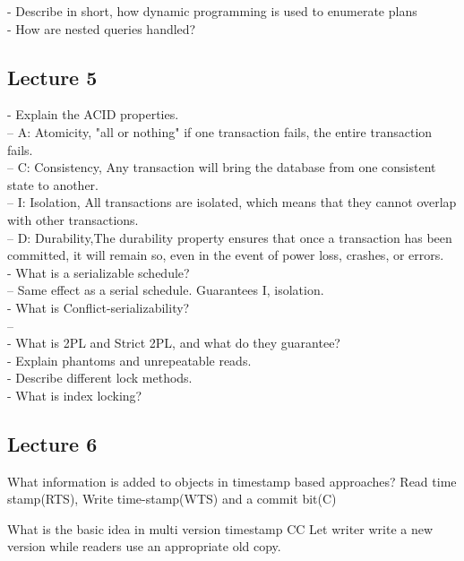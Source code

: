 \documentclass[a4paper,10pt,titlepage]{report}
\begin{document}
 - Describe in short, how dynamic programming is used to enumerate plans\\
 
 - How are nested queries handled?\\

\subsection{Lecture 5}

- Explain the ACID properties.\\
 -- A: Atomicity, "all or nothing" if one transaction fails, the entire transaction fails. \\
 -- C: Consistency, Any transaction will bring the database from one consistent state to another. \\
 -- I: Isolation, All transactions are isolated, which means that they cannot overlap with other transactions. \\
 -- D: Durability,The durability property ensures that once a transaction has been committed, it will remain so, even in the event of power loss, crashes, or errors.\\
 
 - What is a serializable schedule?\\
 -- Same effect as a serial schedule. Guarantees I, isolation.\\
 
 - What is Conflict-serializability?\\
 -- \\
 
 - What is 2PL and Strict 2PL, and what do they guarantee?\\
 
 - Explain phantoms and unrepeatable reads.\\
 
 - Describe different lock methods.\\
 
 - What is index locking?\\

\subsection{Lecture 6}

What information is added to objects in timestamp based approaches?
Read time stamp(RTS), Write time-stamp(WTS) and a commit bit(C)

What is the basic idea in multi version timestamp CC
Let writer write a new version while readers use an appropriate old copy.
\end{document}
